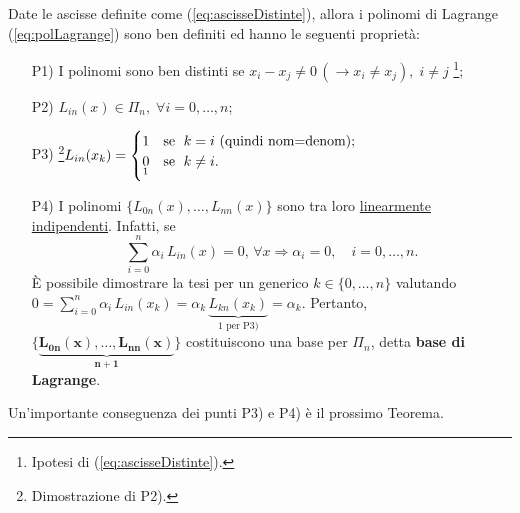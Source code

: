 Date le ascisse definite come (\ref{eq:ascisseDistinte}), allora i polinomi di Lagrange (\ref{eq:polLagrange}) sono ben definiti ed hanno le seguenti proprietà:
\begin{itemize}
    \item[P1)] I polinomi sono ben distinti se $x_i-x_j\neq 0\,(\rightarrow x_i\neq x_j),\; i\neq j$ \footnote{Ipotesi di (\ref{eq:ascisseDistinte}).};
    \item [P2)]\footnotemark $L_{in}(x)\in\Pi_n,\; \forall i=0,\hdots,n$;
    \item[P3)]\footnote{Dimostrazione di P2).}$L_{in}(x_k)=
   \begin{cases}
     1 & \text{se $\;k=i$ (quindi nom=denom);}\\
     \underset{\footnotemark}{0} & \text{se $\;k\neq i$.}
   \end{cases}$
    \item[P4)] I polinomi $\{L_{0n}(x), \hdots, L_{nn}(x)\}$ sono tra loro \uline{linearmente indipendenti}\footnotemark.
    Infatti, se
    \begin{equation*}
        \sum_{i=0}^n \alpha_i\, L_{in}(x)=0, \, \forall x \Longrightarrow \alpha_i=0,\quad i=0,\hdots,n.
    \end{equation*}
    È possibile dimostrare la tesi per un generico $k\in \{0,\hdots,n\}$ valutando $0=\sum_{i=0}^n \alpha_i\, L_{in}(x_k)=\alpha_k\,\underbrace{L_{kn}(x_k)}_{1 \text{ per P3)}}=\alpha_k.$ Pertanto, $\boldsymbol{\{\underbrace{L_{0n}(x), \hdots,L_{nn}(x)}_{n+1}\}}$ costituiscono una base per $\Pi_n$, detta \textbf{base di Lagrange}.
\end{itemize}

Un'importante conseguenza dei punti P3) e P4) è il prossimo Teorema.

